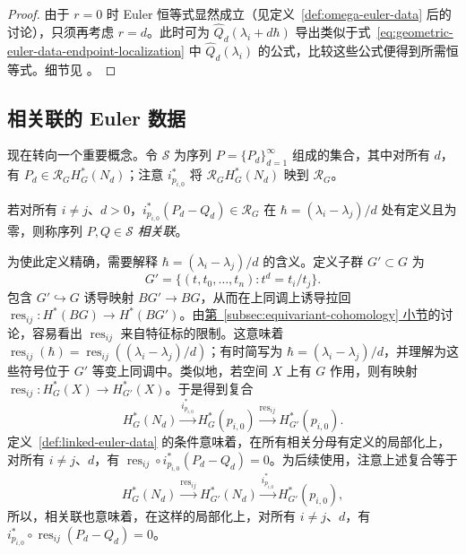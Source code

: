 \begin{proof}
由于 $r=0$ 时 Euler 恒等式显然成立（见定义~\ref{def:omega-euler-data} 后的讨论），只须再考虑 $r=d$。此时可为 $\widehat Q_d(\lambda_i+d\hbar)$ 导出类似于式~\eqref{eq:geometric-euler-data-endpoint-localization} 中 $\widehat Q_d(\lambda_i)$ 的公式，比较这些公式便得到所需恒等式。细节见 。
\end{proof}

\subsection{相关联的 Euler 数据}\label{subsec:linked-euler-data}
现在转向一个重要概念。令 $\mathcal S$ 为序列 $P=\{P_d\}_{d=1}^{\infty}$ 组成的集合，其中对所有 $d$，有 $P_d\in\mathcal R_GH_G^*(N_d)$；注意 $i_{p_{i,0}}^*$ 将 $\mathcal R_GH_G^*(N_d)$ 映到 $\mathcal R_G$。
\begin{definition}\label{def:linked-euler-data}
若对所有 $i\ne j$、$d>0$，$i_{p_{i,0}}^*(P_d-Q_d)\in\mathcal R_G$ 在 $\hbar=(\lambda_i-\lambda_j)/d$ 处有定义且为零，则称序列 $P,Q\in\mathcal S$ \emph{相关联}。
\end{definition}
为使此定义精确，需要解释 $\hbar=(\lambda_i-\lambda_j)/d$ 的含义。定义子群 $G'\subset G$ 为
\[
G'=\{(t,t_0,\ldots,t_n):t^d=t_i/t_j\}.
\]
包含 $G'\hookrightarrow G$ 诱导映射 $BG'\to BG$，从而在上同调上诱导拉回 $\operatorname{res}_{ij}:H^*(BG)\to H^*(BG')$。由\hyperref[subsec:equivariant-cohomology]{第~\ref*{subsec:equivariant-cohomology} 小节}的讨论，容易看出 $\operatorname{res}_{ij}$ 来自特征标的限制。这意味着 $\operatorname{res}_{ij}(\hbar)=\operatorname{res}_{ij}((\lambda_i-\lambda_j)/d)$；有时简写为 $\hbar=(\lambda_i-\lambda_j)/d$，并理解为这些符号位于 $G'$ 等变上同调中。类似地，若空间 $X$ 上有 $G$ 作用，则有映射 $\operatorname{res}_{ij}:H_G^*(X)\to H_{G'}^*(X)$。于是得到复合
\begin{equation}\label{eq:linked-data-restriction-first}
H_G^*(N_d)\xrightarrow{i_{p_{i,0}}^*}H_G^*(p_{i,0})
\xrightarrow{\operatorname{res}_{ij}}H_{G'}^*(p_{i,0}).
\end{equation}
定义~\ref{def:linked-euler-data} 的条件意味着，在所有相关分母有定义的局部化上，对所有 $i\ne j$、$d$，有 $\operatorname{res}_{ij}\circ i_{p_{i,0}}^*(P_d-Q_d)=0$。为后续使用，注意上述复合等于
\begin{equation}\label{eq:linked-data-restriction-second}
H_G^*(N_d)\xrightarrow{\operatorname{res}_{ij}}H_{G'}^*(N_d)
\xrightarrow{i_{p_{i,0}}^*}H_{G'}^*(p_{i,0}),
\end{equation}
所以，相关联也意味着，在这样的局部化上，对所有 $i\ne j$、$d$，有 $i_{p_{i,0}}^*\circ\operatorname{res}_{ij}(P_d-Q_d)=0$。

